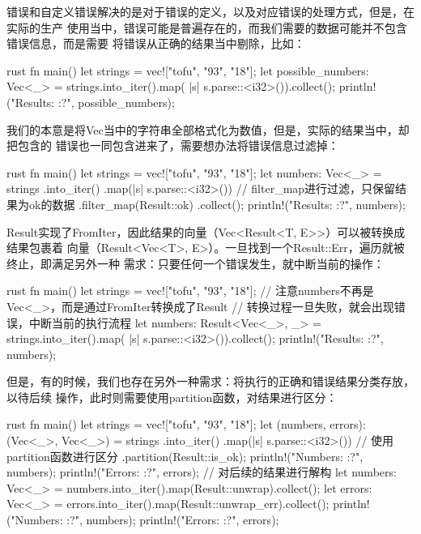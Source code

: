 错误和自定义错误解决的是对于错误的定义，以及对应错误的处理方式，但是，在实际的生产
使用当中，错误可能是普遍存在的，而我们需要的数据可能并不包含错误信息，而是需要
将错误从正确的结果当中剔除，比如：
\begin{code-block}{rust}
fn main() {
    let strings = vec!["tofu", "93", "18"];
    let possible_numbers: Vec<_> = strings.into_iter().map(
        |s| s.parse::<i32>()).collect();
    println!("Results: {:?}", possible_numbers);
}
\end{code-block}
我们的本意是将Vec当中的字符串全部格式化为数值，但是，实际的结果当中，却把包含的
错误也一同包含进来了，需要想办法将错误信息过滤掉：
\begin{code-block}{rust}
fn main() {
    let strings = vec!["tofu", "93", "18"];
    let numbers: Vec<_> = strings
        .into_iter()
        .map(|s| s.parse::<i32>())
        // filter_map进行过滤，只保留结果为ok的数据
        .filter_map(Result::ok)
        .collect();
    println!("Results: {:?}", numbers);
}
\end{code-block}

Result实现了FromIter，因此结果的向量（Vec<Result<T, E>>）可以被转换成结果包裹着
向量（Result<Vec<T>, E>）。一旦找到一个Result::Err，遍历就被终止，即满足另外一种
需求：只要任何一个错误发生，就中断当前的操作：
\begin{code-block}{rust}
fn main() {
    let strings = vec!["tofu", "93", "18"];
    // 注意numbers不再是Vec<_>，而是通过FromIter转换成了Result
    // 转换过程一旦失败，就会出现错误，中断当前的执行流程
    let numbers: Result<Vec<_>, _> = strings.into_iter().map(
        |s| s.parse::<i32>()).collect();
    println!("Results: {:?}", numbers);
}
\end{code-block}

但是，有的时候，我们也存在另外一种需求：将执行的正确和错误结果分类存放，以待后续
操作，此时则需要使用partition函数，对结果进行区分：
\begin{code-block}{rust}
fn main() {
    let strings = vec!["tofu", "93", "18"];
    let (numbers, errors): (Vec<_>, Vec<_>) = strings
        .into_iter()
        .map(|s| s.parse::<i32>())
        // 使用partition函数进行区分
        .partition(Result::is_ok);
    println!("Numbers: {:?}", numbers);
    println!("Errors: {:?}", errors);
    // 对后续的结果进行解构
    let numbers: Vec<_> = numbers.into_iter().map(Result::unwrap).collect();
    let errors: Vec<_> = errors.into_iter().map(Result::unwrap_err).collect();
    println!("Numbers: {:?}", numbers);
    println!("Errors: {:?}", errors);
}
\end{code-block}

